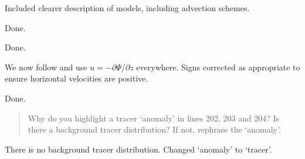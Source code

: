 \documentclass{article}
\begin{document}
\begin{quotation}
\begin{comment}
\item Section 3: Add information about the different numerical options that are assessed in combination with the orography treatment.
\end{comment}
\end{quotation}
Included clearer description of models, including advection schemes.

\begin{quotation}
\begin{comment}
\item Line 189: the term 2a needs be in parenthesis
\end{comment}
\end{quotation}
Done.

\begin{quotation}
\begin{comment}
\item Line 194: be more precise: `\ldots constant wind above $z_2$ \ldots'
\end{comment}
\end{quotation}
Done.

\begin{quotation}
\begin{comment}
\item Line 198 and Eq. (16): Two different sign conventions for the stream function are used with flipped signs that either lead to a negative (line 198) or positive (Eq. (16)) sign in the definition of the zonal velocity $u$.  Unify the presentation.
\end{comment}
\end{quotation}
We now follow \citet{schaer2002} and use $u=-\partial \Psi/\partial z$ everywhere.  Signs corrected as appropriate to ensure horizontal velocities are positive.

\begin{quotation}
\begin{comment}
\item Line 199: rephrase `A tracer with density $\phi$ is \ldots'
\end{comment}
\end{quotation}
Done.

\begin{quotation}
Why do you highlight a tracer `anomaly' in lines 202, 203 and 204?  Is there a background tracer distribution?  If not, rephrase the `anomaly'.
\end{quotation}
There is no background tracer distribution.  Changed `anomaly' to `tracer'.
\end{document}
